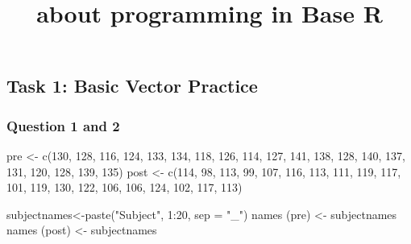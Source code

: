 \documentclass[
  letterpaper,
  DIV=11,
  numbers=noendperiod]{scrartcl}
\title{about programming in Base R}
\author{}
\date{}
\newenvironment{Shaded}{\begin{snugshade}}{\end{snugshade}}
\newcommand{\AttributeTok}[1]{\textcolor[rgb]{0.40,0.45,0.13}{#1}}
\newcommand{\DecValTok}[1]{\textcolor[rgb]{0.68,0.00,0.00}{#1}}
\newcommand{\FunctionTok}[1]{\textcolor[rgb]{0.28,0.35,0.67}{#1}}
\newcommand{\NormalTok}[1]{\textcolor[rgb]{0.00,0.23,0.31}{#1}}
\newcommand{\OtherTok}[1]{\textcolor[rgb]{0.00,0.23,0.31}{#1}}
\newcommand{\SpecialCharTok}[1]{\textcolor[rgb]{0.37,0.37,0.37}{#1}}
\newcommand{\StringTok}[1]{\textcolor[rgb]{0.13,0.47,0.30}{#1}}
\begin{document}
\maketitle


\subsection{Task 1: Basic Vector
Practice}\label{task-1-basic-vector-practice}

\subsubsection{Question 1 and 2}\label{question-1-and-2}

\begin{Shaded}
\begin{Highlighting}[]
\NormalTok{pre }\OtherTok{\textless{}{-}} \FunctionTok{c}\NormalTok{(}\DecValTok{130}\NormalTok{, }\DecValTok{128}\NormalTok{, }\DecValTok{116}\NormalTok{, }\DecValTok{124}\NormalTok{, }\DecValTok{133}\NormalTok{, }\DecValTok{134}\NormalTok{, }\DecValTok{118}\NormalTok{, }\DecValTok{126}\NormalTok{, }\DecValTok{114}\NormalTok{, }\DecValTok{127}\NormalTok{, }\DecValTok{141}\NormalTok{, }\DecValTok{138}\NormalTok{, }\DecValTok{128}\NormalTok{, }\DecValTok{140}\NormalTok{, }\DecValTok{137}\NormalTok{, }\DecValTok{131}\NormalTok{, }\DecValTok{120}\NormalTok{, }\DecValTok{128}\NormalTok{, }\DecValTok{139}\NormalTok{, }\DecValTok{135}\NormalTok{)}
\NormalTok{post }\OtherTok{\textless{}{-}} \FunctionTok{c}\NormalTok{(}\DecValTok{114}\NormalTok{, }\DecValTok{98}\NormalTok{, }\DecValTok{113}\NormalTok{, }\DecValTok{99}\NormalTok{, }\DecValTok{107}\NormalTok{, }\DecValTok{116}\NormalTok{, }\DecValTok{113}\NormalTok{, }\DecValTok{111}\NormalTok{, }\DecValTok{119}\NormalTok{, }\DecValTok{117}\NormalTok{, }\DecValTok{101}\NormalTok{, }\DecValTok{119}\NormalTok{, }\DecValTok{130}\NormalTok{, }\DecValTok{122}\NormalTok{, }\DecValTok{106}\NormalTok{, }\DecValTok{106}\NormalTok{, }\DecValTok{124}\NormalTok{, }\DecValTok{102}\NormalTok{, }\DecValTok{117}\NormalTok{, }\DecValTok{113}\NormalTok{)}

\NormalTok{subjectnames}\OtherTok{\textless{}{-}}\FunctionTok{paste}\NormalTok{(}\StringTok{"Subject"}\NormalTok{, }\DecValTok{1}\SpecialCharTok{:}\DecValTok{20}\NormalTok{, }\AttributeTok{sep =} \StringTok{"\_"}\NormalTok{)}
\FunctionTok{names}\NormalTok{ (pre) }\OtherTok{\textless{}{-}}\NormalTok{ subjectnames}
\FunctionTok{names}\NormalTok{ (post) }\OtherTok{\textless{}{-}}\NormalTok{ subjectnames}
\end{Highlighting}
\end{Shaded}
\end{document}
